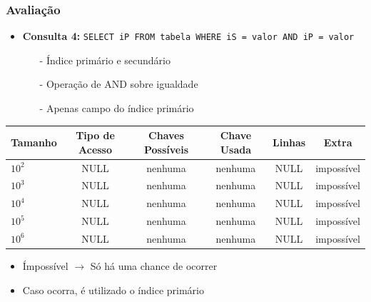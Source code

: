 \documentclass[10pt]{beamer}
\begin{document}
\begin{frame}[fragile]
  \frametitle{Avaliação}

    \begin{itemize}
      \item \textbf{Consulta 4: } \footnotesize{\texttt{SELECT iP FROM tabela WHERE iS = valor AND iP = valor}}
      \begin{itemize}
        \item[-] Índice primário e secundário
        \item[-] Operação de AND sobre igualdade
        \item[-] Apenas campo do índice primário
      \end{itemize}

    \end{itemize}

     \begin{table}[!htb]
    \footnotesize
    \centering
    \begin{tabular}{lccccc}
      \toprule
      \textbf{Tamanho} & \textbf{Tipo de Acesso}  & \textbf{Chaves Possíveis}  & \textbf{Chave Usada} & \textbf{Linhas} & \textbf{Extra}  \\
      \midrule
      $10^2$  & NULL  &  nenhuma  & nenhuma  & NULL  & impossível \\
      $10^3$  & NULL  &  nenhuma  & nenhuma  & NULL  & impossível \\
      $10^4$  & NULL  &  nenhuma  & nenhuma  & NULL  & impossível \\
      $10^5$  & NULL  &  nenhuma  & nenhuma  & NULL  & impossível \\
      $10^6$  & NULL  &  nenhuma  & nenhuma  & NULL  & impossível \\

      \bottomrule
    \end{tabular}
    \end{table}
   
    \begin{itemize}
    \item Ímpossível $\to$ Só há uma chance de ocorrer
    \item Caso ocorra, é utilizado o índice primário
    \end{itemize}


\end{frame}
\end{document}
